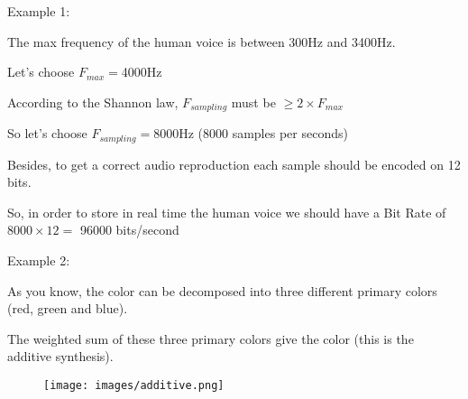 \documentclass[handout]{beamer}[10pt, usepdftitle=false]
\begin{document}
	\begin{frame}
	
	Example 1:
	\vspace*{1em}	
	
	The max frequency of the human voice is between 300Hz and 3400Hz.
	\vspace*{0.5em}	
	
	Let's choose $F_{max}=$4000Hz
	\vspace*{0.5em}	
	
	According to the Shannon law, $F_{sampling}$ must be $\geq 2\times F_{max}$
	\vspace*{0.5em}	
	
	So let's choose $F_{sampling}=$8000Hz (8000 samples per seconds)
	\vspace*{0.5em}	
	
	Besides, to get a correct audio reproduction each sample should be encoded on 12 bits.
	\vspace*{0.5em}	
	
	So, in order to store in real time the human voice we should have a Bit Rate of $8000\times 12=$ 96000 bits/second 	
	\vspace*{0.5em}	
	
		
	\end{frame}

	\begin{frame}

	Example 2:
	\vspace*{1em}	
	
	As you know, the color can be decomposed into three different primary colors (red, green and blue).
	\vspace*{0.5em}	
	
	The weighted sum of these three primary colors give the color (this is the additive synthesis).
	\vspace*{0.5em}	
	
	 \begin{center}	
	\begin{figure}
		\texttt{[image: images/additive.png]} 
	\end{figure}	
	\end{center}
	
	
	\end{frame}
\end{document}
